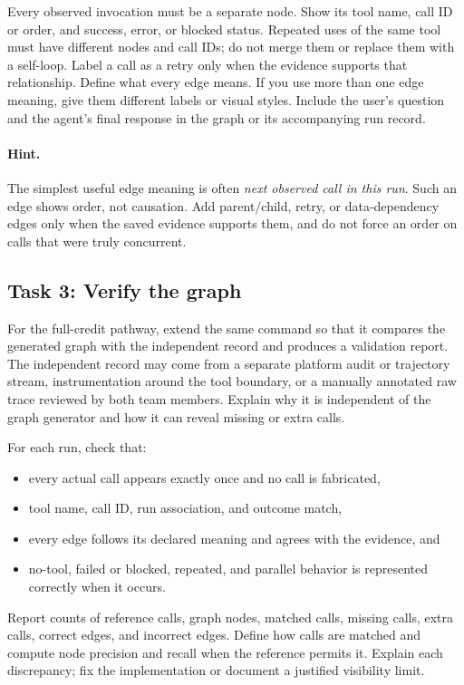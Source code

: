 \documentclass[11pt]{article}
\begin{document}
Every observed invocation must be a separate node. Show its tool name, call ID or order, and success, error, or blocked status. Repeated uses of the same tool must have different nodes and call IDs; do not merge them or replace them with a self-loop. Label a call as a retry only when the evidence supports that relationship. Define what every edge means. If you use more than one edge meaning, give them different labels or visual styles. Include the user's question and the agent's final response in the graph or its accompanying run record.

\paragraph{Hint.}
The simplest useful edge meaning is often \emph{next observed call in this run}. Such an edge shows order, not causation. Add parent/child, retry, or data-dependency edges only when the saved evidence supports them, and do not force an order on calls that were truly concurrent.

\subsection{Task 3: Verify the graph}
For the full-credit pathway, extend the same command so that it compares the generated graph with the independent record and produces a validation report. The independent record may come from a separate platform audit or trajectory stream, instrumentation around the tool boundary, or a manually annotated raw trace reviewed by both team members. Explain why it is independent of the graph generator and how it can reveal missing or extra calls.

For each run, check that:
\begin{itemize}
  \item every actual call appears exactly once and no call is fabricated,
  \item tool name, call ID, run association, and outcome match,
  \item every edge follows its declared meaning and agrees with the evidence, and
  \item no-tool, failed or blocked, repeated, and parallel behavior is represented correctly when it occurs.
\end{itemize}
Report counts of reference calls, graph nodes, matched calls, missing calls, extra calls, correct edges, and incorrect edges. Define how calls are matched and compute node precision and recall when the reference permits it. Explain each discrepancy; fix the implementation or document a justified visibility limit.
\end{document}
